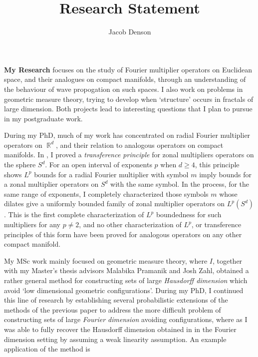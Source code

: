 \documentclass[12pt]{article}
\title{Research Statement}
\author{Jacob Denson}
\date{}
\DeclareMathOperator{\RR}{\mathbb{R}}
\begin{document}
\maketitle

{\bf My Research} focuses on the study of Fourier multiplier operators on Euclidean space, and their analogues on compact manifolds, through an understanding of the behaviour of wave propogation on such spaces. I also work on problems in geometric measure theory, trying to develop when `structure' occurs in fractals of large dimension. Both projects lead to interesting questions that I plan to pursue in my postgraduate work.

During my PhD, much of my work has concentrated on radial Fourier multiplier operators on $\RR^d$, and their relation to analogous operators on compact manifolds. In \cite{DensonCharacterization}, I proved a \emph{transference principle} for zonal multipliers operators on the sphere $S^d$. For an open interval of exponents $p$ when $d \geq 4$, this principle shows $L^p$ bounds for a radial Fourier multiplier with symbol $m$ imply bounds for a zonal multiplier operators on $S^d$ with the same symbol. In the process, for the same range of exponents, I completely characterized those symbols $m$ whose dilates give a uniformly bounded family of zonal multiplier operators on $L^p(S^d)$. This is the first complete characterization of $L^p$ boundedness for such multipliers for any $p \neq 2$, and no other characterization of $L^p$, or transference principles of this form have been proved for analogous operators on any other compact manifold.

My MSc work mainly focused on geometric measure theory, where $I$, together with my Master's thesis advisors Malabika Pramanik and Josh Zahl, obtained a rather general method \cite{DensonPramanikZahl} for constructing sets of large \emph{Hausdorff dimension} which avoid `low dimensional geometric configurations'. During my PhD, I continued this line of research by establishing several probabilistic extensions of the methods of the previous paper \cite{DensonFourier} to address the more difficult problem of constructing sets of large \emph{Fourier dimension} avoiding configurations, where as I was able to fully recover the Hausdorff dimension obtained in \cite{DensonPramanikZahl} in the Fourier dimension setting by assuming a weak linearity assumption. An example application of the method is 

%
%
\end{document}
